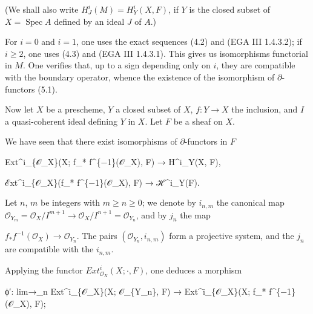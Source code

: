 \documentclass[
]{article}
\newenvironment{Shaded}{}{}
\newcommand{\NormalTok}[1]{#1}
\begin{document}
(We shall also write \(H^{i}_{J}(M) = H^{i}_{Y}(X, F)\), if \(Y\) is the
closed subset of \(X = \operatorname{Spec} A\) defined by an ideal \(J\)
of \(A\).)

For \(i = 0\) and \(i = 1\), one uses the exact sequences (4.2) and (EGA
III 1.4.3.2); if \(i \geqslant 2\), one uses (4.3) and (EGA III
1.4.3.1). This gives us isomorphisms functorial in \(M\). One verifies
that, up to a sign depending only on \(i\), they are compatible with the
boundary operator, whence the existence of the isomorphism of
\(\partial\)-functors (5.1).

Now let \(X\) be a prescheme, \(Y\) a closed subset of \(X\),
\(f: Y \to X\) the inclusion, and \(I\) a quasi-coherent ideal defining
\(Y\) in \(X\). Let \(F\) be a sheaf on \(X\).

We have seen that there exist isomorphisms of \(\partial\)-functors in
\(F\)

\begin{Shaded}
\begin{Highlighting}[]
\NormalTok{Ext\^{}i\_\{𝒪\_X\}(X; f\_* f\^{}\{−1\}(𝒪\_X), F) → H\^{}i\_Y(X, F),}
\end{Highlighting}
\end{Shaded}

\begin{Shaded}
\begin{Highlighting}[]
\NormalTok{ℰxt\^{}i\_\{𝒪\_X\}(f\_* f\^{}\{−1\}(𝒪\_X), F) → ℋ\^{}i\_Y(F).}
\end{Highlighting}
\end{Shaded}

Let \(n\), \(m\) be integers with \(m \geqslant n \geqslant 0\); we
denote by \(i_{n,m}\) the canonical map
\(\mathcal{O}_{Y_{m}} = \mathcal{O}_{X}/I^{m+1} \to \mathcal{O}_{X}/I^{n+1} = \mathcal{O}_{Y_{n}}\),
and by \(j_{n}\) the map

\(f_{*} f^{-1}(\mathcal{O}_{X}) \to \mathcal{O}_{Y_{n}}\). The pairs
\((\mathcal{O}_{Y_{n}}, i_{n,m})\) form a projective system, and the
\(j_{n}\) are compatible with the \(i_{n,m}\).

Applying the functor \(Ext^{i}_{\mathcal{O}_{X}}(X; \cdot, F)\), one
deduces a morphism

\begin{Shaded}
\begin{Highlighting}[]
\NormalTok{ϕ′: lim→\_n Ext\^{}i\_\{𝒪\_X\}(X; 𝒪\_\{Y\_n\}, F) → Ext\^{}i\_\{𝒪\_X\}(X; f\_* f\^{}\{−1\}(𝒪\_X), F);}
\end{Highlighting}
\end{Shaded}
\end{document}
